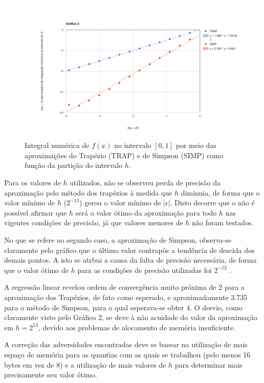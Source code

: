 \documentclass{article}
\begin{document}
\begin{figure}[h]
  \centering
  \includegraphics[width=\textwidth]{graf2}
  \caption{Integral numérica de $f(x)$ no intervalo $[0, 1]$ por meio das aproximações do Trapézio (TRAP) e de Simpson (SIMP) como função da partição do intervalo $h$.}
  \label{fig:2}
\end{figure}

Para os valores de $h$ utilizados, não se observou perda de precisão da aproximação pelo método dos trapézios à medida que $h$ diminuia, de forma que o valor mínimo de $h$ ($2^{-13}$) gerou o valor mínimo de $|\epsilon|$. Disto decorre que o não é possível afirmar que $h$ será o valor ótimo da aproximação para todo $h$ nas vigentes condições de precisão, já que valores menores de $h$ não foram testados.\par

No que se refere ao segundo caso, a aproximação de Simpson, observa-se claramente pelo gráfico que o último valor contrapôs a tendência de descida dos demais pontos. A isto se atrbui a causa da falta de precisão necessária, de forma que o valor ótimo de $h$ para as condições de precisão utilizadas foi $2^{-12}$ .\par

A regressão linear revelou ordem de convergência muito próxima de 2 para a aproximação dos Trapézios, de fato como esperado, e aproximadamente 3.735 para o método de Simpson, para o qual esperava-se obter 4.
O desvio, como claramente visto pelo Gráfico 2, se deve à não acuidade do valor da aproximação em $h = 2^{13}$, devido aos problemas de alocamento de memória insuficiente.\par
A correção das adversidades encontradas deve se basear na utilização de mais espaço de memória para as quantias com as quais se trabalhou (pelo menos 16 bytes em vez de 8) e a utilização de mais valores de $h$ para determinar mais precisamente seu valor ótimo.
\end{document}
